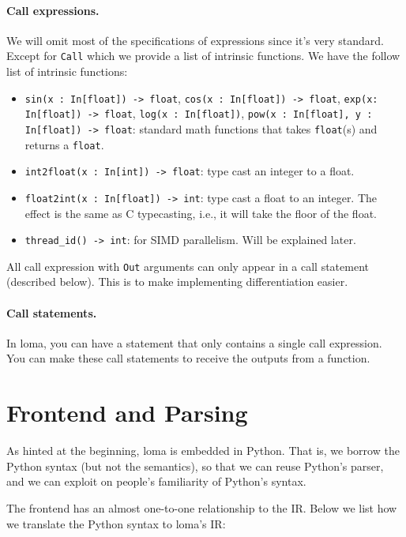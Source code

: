 \paragraph{Call expressions.}
We will omit most of the specifications of expressions since it's very standard. Except for \lstinline{Call} which we provide a list of intrinsic functions. We have the follow list of intrinsic functions:

\begin{itemize}
\item \lstinline{sin(x : In[float]) -> float}, \lstinline{cos(x : In[float]) -> float}, \lstinline{exp(x: In[float]) -> float}, \lstinline{log(x : In[float])}, \lstinline{pow(x : In[float], y : In[float]) -> float}: standard math functions that takes \lstinline{float}(s) and returns a \lstinline{float}.
\item \lstinline{int2float(x : In[int]) -> float}: type cast an integer to a float.
\item \lstinline{float2int(x : In[float]) -> int}: type cast a float to an integer. The effect is the same as C typecasting, i.e., it will take the floor of the float.
\item \lstinline{thread_id() -> int}: for SIMD parallelism. Will be explained later.
\end{itemize}

All call expression with \lstinline{Out} arguments can only appear in a call statement (described below). This is to make implementing differentiation easier.

\paragraph{Call statements.}
In loma, you can have a statement that only contains a single call expression. You can make these call statements to receive the outputs from a function.

\section{Frontend and Parsing}
As hinted at the beginning, loma is embedded in Python. That is, we borrow the Python syntax (but not the semantics), so that we can reuse Python's parser, and we can exploit on people's familiarity of Python's syntax. 

The frontend has an almost one-to-one relationship to the IR. Below we list how we translate the Python syntax to loma's IR: 

